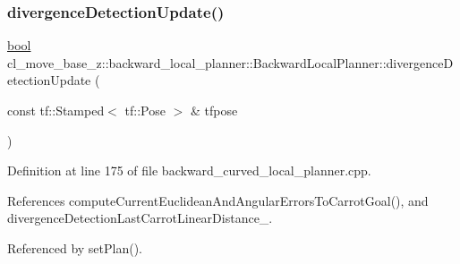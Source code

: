 \subsubsection{\texorpdfstring{divergence\+Detection\+Update()}{divergenceDetectionUpdate()}}
{\footnotesize\ttfamily \hyperlink{classbool}{bool} cl\+\_\+move\+\_\+base\+\_\+z\+::backward\+\_\+local\+\_\+planner\+::\+Backward\+Local\+Planner\+::divergence\+Detection\+Update (\begin{DoxyParamCaption}\item[{const tf\+::\+Stamped$<$ tf\+::\+Pose $>$ \&}]{tfpose }\end{DoxyParamCaption})\hspace{0.3cm}{\ttfamily [private]}}



Definition at line 175 of file backward\+\_\+curved\+\_\+local\+\_\+planner.\+cpp.



References compute\+Current\+Euclidean\+And\+Angular\+Errors\+To\+Carrot\+Goal(), and divergence\+Detection\+Last\+Carrot\+Linear\+Distance\+\_\+.



Referenced by set\+Plan().


